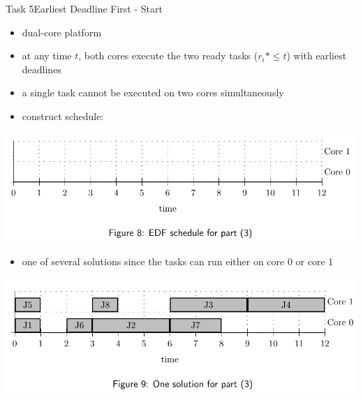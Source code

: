 \begin{frame}[allowframebreaks]{Task 5}{Earliest Deadline First - Start\vspace{0.5cm}}
  \begin{tasknoinc}
    \begin{itemize}
      \item \alert{dual-core platform}
      \item at any time $t$, both cores execute the two ready tasks ($r_i* \le t$) with \alert{earliest deadlines}
      \item a single task \alert{cannot} be executed on two cores simultaneously
      \item construct schedule:
    \end{itemize}
  \end{tasknoinc}
  \begin{tasknoinc}
    \includegraphics[width=\textwidth]{./figures/5_diag.png}
  \end{tasknoinc}
  \begin{solution}
    \begin{itemize}
      \item \alert{one of several solutions} since the tasks can run either on core 0 or core 1
    \end{itemize}
    \includegraphics[width=\textwidth]{./figures/5_diag_sol.png}
  \end{solution}
\end{frame}

